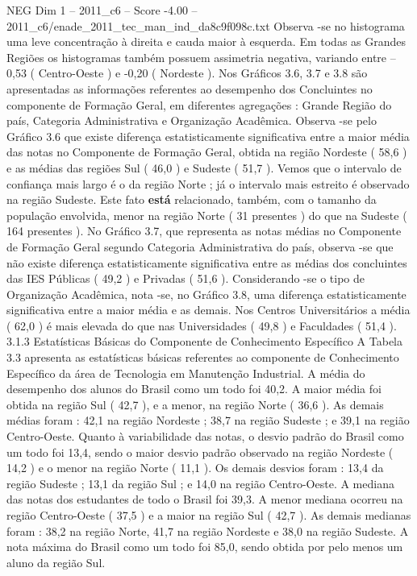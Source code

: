 \begin{textsample}{NEG Dim 1 – 2011\_c6 – Score -4.00 – 2011\_c6/enade\_2011\_tec\_man\_ind\_da8c9f098c.txt}
Observa -se no histograma uma leve concentração à direita e cauda maior à esquerda.
Em todas as Grandes Regiões os histogramas também possuem assimetria negativa, variando entre – 0,53 ( Centro-Oeste ) e -0,20 ( Nordeste ).
Nos Gráficos 3.6, 3.7 e 3.8 são apresentadas as informações referentes ao desempenho dos Concluintes no componente de Formação Geral, em diferentes agregações : Grande Região do país, Categoria Administrativa e Organização Acadêmica.
Observa -se pelo Gráfico 3.6 que existe diferença estatisticamente significativa entre a maior média das notas no Componente de Formação Geral, obtida na região Nordeste ( 58,6 ) e as médias das regiões Sul ( 46,0 ) e Sudeste ( 51,7 ).
Vemos que o intervalo de confiança mais largo é o da região Norte ; já o intervalo mais estreito é observado na região Sudeste.
Este fato \textbf{está} relacionado, também, com o tamanho da população envolvida, menor na região Norte ( 31 presentes ) do que na Sudeste ( 164 presentes ).
No Gráfico 3.7, que representa as notas médias no Componente de Formação Geral segundo Categoria Administrativa do país, observa -se que não existe diferença estatisticamente significativa entre as médias dos concluintes das IES Públicas ( 49,2 ) e Privadas ( 51,6 ).
Considerando -se o tipo de Organização Acadêmica, nota -se, no Gráfico 3.8, uma diferença estatisticamente significativa entre a maior média e as demais.
Nos Centros Universitários a média ( 62,0 ) é mais elevada do que nas Universidades ( 49,8 ) e Faculdades ( 51,4 ). 3.1.3 Estatísticas Básicas do Componente de Conhecimento Específico A Tabela 3.3 apresenta as estatísticas básicas referentes ao componente de Conhecimento Específico da área de Tecnologia em Manutenção Industrial.
A média do desempenho dos alunos do Brasil como um todo foi 40,2.
A maior média foi obtida na região Sul ( 42,7 ), e a menor, na região Norte ( 36,6 ).
As demais médias foram : 42,1 na região Nordeste ; 38,7 na região Sudeste ; e 39,1 na região Centro-Oeste.
Quanto à variabilidade das notas, o desvio padrão do Brasil como um todo foi 13,4, sendo o maior desvio padrão observado na região Nordeste ( 14,2 ) e o menor na região Norte ( 11,1 ).
Os demais desvios foram : 13,4 da região Sudeste ; 13,1 da região Sul ; e 14,0 na região Centro-Oeste.
A mediana das notas dos estudantes de todo o Brasil foi 39,3.
A menor mediana ocorreu na região Centro-Oeste ( 37,5 ) e a maior na região Sul ( 42,7 ).
As demais medianas foram : 38,2 na região Norte, 41,7 na região Nordeste e 38,0 na região Sudeste.
A nota máxima do Brasil como um todo foi 85,0, sendo obtida por pelo menos um aluno da região Sul.

\end{textsample}
